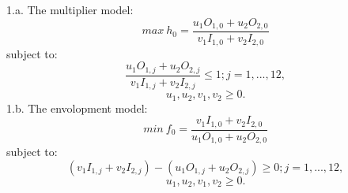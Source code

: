 \documentclass{article}
\begin{document}
1.a.
The multiplier model:
$$ max\ h_0 = \frac{u_1 O_{1,0} + u_2 O_{2,0}}{v_1 I_{1,0} + v_2 I_{2,0}} $$
subject to:
$$ \frac{u_1 O_{1,j} + u_2 O_{2,j}}{v_1 I_{1,j} + v_2 I_{2,j}} \leq 1; j = 1, ..., 12, $$
$$ u_1, u_2, v_1, v_2 \geq 0. $$
1.b.
The envolopment model:
$$ min\ f_0 = \frac{v_1 I_{1,0} + v_2 I_{2,0}}{u_1 O_{1,0} + u_2 O_{2,0}} $$
subject to:
$$ (v_1 I_{1,j} + v_2 I_{2,j}) - (u_1 O_{1,j} + u_2 O_{2,j}) \geq 0; j = 1, ..., 12, $$
$$ u_1, u_2, v_1, v_2 \geq 0. $$
\end{document}
